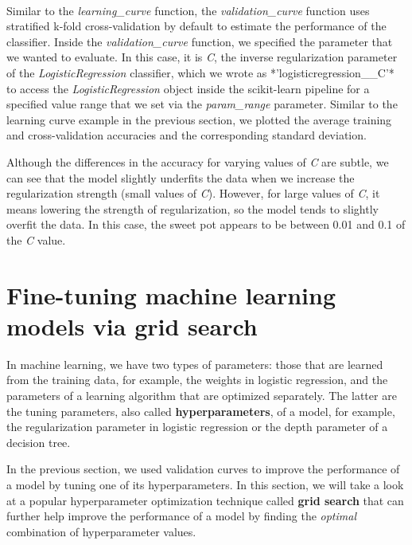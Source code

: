 \documentclass[11pt]{article}
\begin{document}
    \begin{center}
    \end{center}
    { \hspace*{\fill} \\}
    
    Similar to the \emph{learning\_curve} function, the
\emph{validation\_curve} function uses stratified k-fold
cross-validation by default to estimate the performance of the
classifier. Inside the \emph{validation\_curve} function, we specified
the parameter that we wanted to evaluate. In this case, it is \emph{C},
the inverse regularization parameter of the \emph{LogisticRegression}
classifier, which we wrote as *'logisticregression\_\_C'* to access the
\emph{LogisticRegression} object inside the scikit-learn pipeline for a
specified value range that we set via the \emph{param\_range} parameter.
Similar to the learning curve example in the previous section, we
plotted the average training and cross-validation accuracies and the
corresponding standard deviation.

Although the differences in the accuracy for varying values of \emph{C}
are subtle, we can see that the model slightly underfits the data when
we increase the regularization strength (small values of \emph{C}).
However, for large values of \emph{C}, it means lowering the strength of
regularization, so the model tends to slightly overfit the data. In this
case, the sweet pot appears to be between 0.01 and 0.1 of the \emph{C}
value.

    \section{Fine-tuning machine learning models via grid
search}\label{fine-tuning-machine-learning-models-via-grid-search}

    In machine learning, we have two types of parameters: those that are
learned from the training data, for example, the weights in logistic
regression, and the parameters of a learning algorithm that are
optimized separately. The latter are the tuning parameters, also called
\textbf{hyperparameters}, of a model, for example, the regularization
parameter in logistic regression or the depth parameter of a decision
tree.

In the previous section, we used validation curves to improve the
performance of a model by tuning one of its hyperparameters. In this
section, we will take a look at a popular hyperparameter optimization
technique called \textbf{grid search} that can further help improve the
performance of a model by finding the \emph{optimal} combination of
hyperparameter values.
\end{document}
